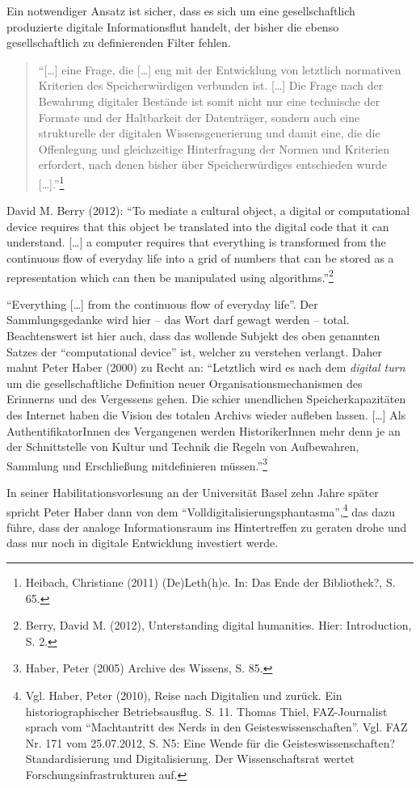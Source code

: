 \documentclass[a4paper,
fontsize=11pt,
oneside,
numbers=noperiodatend,
parskip=half-,
bibliography=totoc,
final
]{scrartcl}
\begin{document}
Ein notwendiger Ansatz ist sicher, dass es sich um eine gesellschaftlich
produzierte digitale Informationsflut handelt, der bisher die ebenso
gesellschaftlich zu definierenden Filter fehlen.

\begin{quote}
\enquote{{[}\ldots{}{]} eine Frage, die {[}\ldots{}{]} eng mit der
Entwicklung von letztlich normativen Kriterien des Speicherwürdigen
verbunden ist. {[}\ldots{}{]} Die Frage nach der Bewahrung digitaler
Bestände ist somit nicht nur eine technische der Formate und der
Haltbarkeit der Datenträger, sondern auch eine strukturelle der
digitalen Wissensgenerierung und damit eine, die die Offenlegung und
gleichzeitige Hinterfragung der Normen und Kriterien erfordert, nach
denen bisher über Speicherwürdiges entschieden wurde
{[}\ldots{}{]}.}\footnote{Heibach, Christiane (2011) (De)Leth(h)e. In:
  Das Ende der Bibliothek?, S. 65.}
\end{quote}

David M. Berry (2012): \enquote{To mediate a cultural object, a digital
or computational device requires that this object be translated into the
digital code that it can understand. {[}\ldots{}{]} a computer requires
that everything is transformed from the continuous flow of everyday life
into a grid of numbers that can be stored as a representation which can
then be manipulated using algorithms.}\footnote{Berry, David M. (2012),
  Unterstanding digital humanities. Hier: Introduction, S. 2.}

\enquote{Everything {[}\ldots{}{]} from the continuous flow of everyday
life}. Der Sammlungsgedanke wird hier -- das Wort darf gewagt werden --
total. Beachtenswert ist hier auch, dass das wollende Subjekt des oben
genannten Satzes der \enquote{computational device} ist, welcher zu
verstehen verlangt. Daher mahnt Peter Haber (2000) zu Recht an:
\enquote{Letztlich wird es nach dem \emph{digital turn} um die
gesellschaftliche Definition neuer Organisationsmechanismen des
Erinnerns und des Vergessens gehen. Die schier unendlichen
Speicherkapazitäten des Internet haben die Vision des totalen Archivs
wieder aufleben lassen. {[}\ldots{}{]} Als AuthentifikatorInnen des
Vergangenen werden HistorikerInnen mehr denn je an der Schnittstelle von
Kultur und Technik die Regeln von Aufbewahren, Sammlung und Erschließung
mitdefinieren müssen.}\footnote{Haber, Peter (2005) Archive des Wissens,
  S. 85.}

In seiner Habilitationsvorlesung an der Universität Basel zehn Jahre
später spricht Peter Haber dann von dem
\enquote{Volldigitalisierungsphantasma},\footnote{Vgl. Haber, Peter
  (2010), Reise nach Digitalien und zurück. Ein historiographischer
  Betriebsausflug. S. 11. Thomas Thiel, FAZ-Journalist sprach vom
  \enquote{Machtantritt des Nerds in den Geisteswissenschaften}. Vgl.
  FAZ Nr. 171 vom 25.07.2012, S. N5: Eine Wende für die
  Geisteswissenschaften? Standardisierung und Digitalisierung. Der
  Wissenschaftsrat wertet Forschungsinfrastrukturen auf.} das dazu
führe, dass der analoge Informationsraum ins Hintertreffen zu geraten
drohe und dass nur noch in digitale Entwicklung investiert werde.
\end{document}
